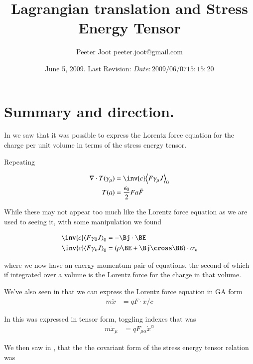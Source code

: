 \documentclass{article}
\title{Lagrangian translation and Stress Energy Tensor}\label{chap:stress_energy_noethers}
\author{Peeter Joot \quad peeter.joot@gmail.com }
\date{ June 5, 2009.  Last Revision: $Date: 2009/06/07 15:15:20 $ }
\begin{document}
\maketitle{}
\tableofcontents
\section{ Summary and direction. }

In 
\cite{PJstressEnergyLorentz} 
we saw that it was
possible to express the Lorentz force equation for the charge per unit
volume in terms of the stress energy tensor.

Repeating 

\begin{align}
\grad \cdot T(\gamma_\mu) &= \inv{c} \gpgradezero{ F \gamma_\mu J } \\
T(a) &= \frac{\epsilon_0}{2} F a \tilde{F}
\end{align}

While these
may not appear too much like the Lorentz force equation as we are used
to seeing it, with some manipulation we found 

\begin{align}
\inv{c} \gpgradezero{ F \gamma_0 J } &= -\Bj \cdot \BE \\
\inv{c} \gpgradezero{ F \gamma_k J } &= (\rho \BE + \Bj \cross \BB) \cdot \sigma_k
\end{align}

where we now have an energy momentum pair of equations, the second
of which if integrated over a volume is the Lorentz force for the charge
in that volume.

We've also seen in
that we can express the Lorentz force equation in GA form
\begin{align}
m \ddot{x} &= q F \cdot \dot{x}/c
\end{align}

In 
this was expressed in tensor form, toggling indexes that was
\begin{align}
m \ddot{x}_\mu &= {q} F_{\mu\alpha} \dot{x}^\alpha
\end{align}

We then saw in
\cite{PJenMtensor}
, that the
the covariant form of the stress energy tensor relation was
\end{document}
